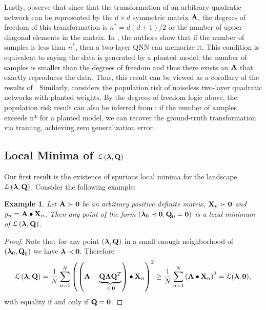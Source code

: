 \documentclass[11pt]{article}
\theoremstyle{plain}
\newtheorem{example}{Example}
\DeclareMathOperator*{\llq}{\ensuremath{\mathcal{L} \left(\V{\lambda},\Mx{Q}\right)} }
\theoremstyle{plain}
\numberwithin{equation}{section}
\numberwithin{lemma}{section}
\numberwithin{theorem}{section}
\numberwithin{corollary}{section}
\numberwithin{observation}{section}
\numberwithin{definition}{section}
\numberwithin{example}{section}
\begin{document}
Lastly, observe that since that the transformation of an arbitrary quadratic network can be represented by the $d \times d$ symmetric matrix $\Mx{A}$, the degrees of freedom of this transformation is $n^* = d(d+1)/2$ or the number of upper diagonal elements in the matrix.  In \cite{ge2016matrix}, the authors show that if the number of samples is less than $n^*$, then a two-layer QNN can memorize it.  This condition is equivalent to saying the data is generated by a planted model; the number of samples is smaller than the degrees of freedom and thus there exists an $\Mx{A}$ that exactly reproduces the data.  Thus, this result can be viewed as a corollary of the results of \cite{JS19}.  Similarly, \cite{gamarnik2019stationary} considers the population risk of noiseless two-layer quadratic networks with planted weights.  By the degrees of freedom logic above, the population risk result can also be inferred from \cite{JS19}: if the number of samples exceeds n* for a planted model, we can recover the ground-truth transformation via training, achieving zero generalization error.



\subsection{Local Minima of \texorpdfstring{$\llq$}{L(l, Q)}}
Our first result is the existence of spurious local minima for the landscape $\llq$.  Consider the following example:

\begin{example} \label{ex:1} Let $\Mx{A} \succ \Mx{0}$ be an arbitrary positive definite matrix, $\Mx{X}_n \succ \Mx{0}$ and $y_n = \Mx{A} \bullet \Mx{X}_n$. Then any point of the form $(\V{\lambda}_0 \prec \Mx{0}, \Mx{Q}_0 = \Mx{0})$ is a local minimum of $\llq$.
\end{example}

\begin{proof}
Note that for any point $(\V{\lambda}, \Mx{Q})$ in a small enough neighborhood of $(\V{\lambda}_0, \Mx{Q}_0)$ we have $\V{\lambda} \prec \Mx{0}$. Therefore
\begin{align}
\llq = \frac{1}{N}\sum_{n=1}^N \left( \left( \Mx{A}- \underbrace{\Mx{Q \Lambda Q}^T}_{ \preceq \;\Mx{0}} \right) \bullet \Mx{X}_n \right)^2  \geq \frac{1}{N}\sum_{n=1}^N \left( \Mx{A} \bullet \Mx{X}_n \right)^2 = \mathcal{L}(\V{\lambda},\Mx{0}),
\end{align}
with equality if and only if $\Mx{Q} = \Mx{0}$.
\end{proof}
\end{document}
